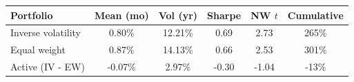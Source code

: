 \begin{tabular}{lccccc}
\toprule
Portfolio & Mean (mo) & Vol (yr) & Sharpe & NW $t$ & Cumulative \\
\midrule
Inverse volatility & 0.80\% & 12.21\% & 0.69 & 2.73 & 265\% \\
Equal weight & 0.87\% & 14.13\% & 0.66 & 2.53 & 301\% \\
Active (IV - EW) & -0.07\% & 2.97\% & -0.30 & -1.04 & -13\% \\
\bottomrule
\end{tabular}
